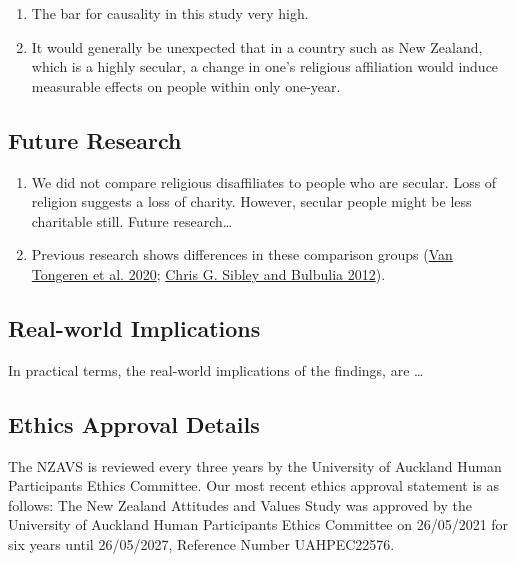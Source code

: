 \documentclass[
  singlecolumn]{report}
\providecommand{\tightlist}{%
  \setlength{\itemsep}{0pt}\setlength{\parskip}{0pt}}\usepackage{longtable,booktabs,array}
\begin{document}
\begin{enumerate}
\def\labelenumi{\arabic{enumi}.}
\tightlist
\item
  The bar for causality in this study very high.
\item
  It would generally be unexpected that in a country such as New
  Zealand, which is a highly secular, a change in one's religious
  affiliation would induce measurable effects on people within only
  one-year.
\end{enumerate}

\hypertarget{future-research}{%
\subsection{Future Research}\label{future-research}}

\begin{enumerate}
\def\labelenumi{\arabic{enumi}.}
\tightlist
\item
  We did not compare religious disaffiliates to people who are secular.
  Loss of religion suggests a loss of charity. However, secular people
  might be less charitable still. Future research\ldots{}
\item
  Previous research shows differences in these comparison groups
  (\protect\hyperlink{ref-vantongeren2020}{Van Tongeren et al. 2020};
  \protect\hyperlink{ref-sibley2012a}{Chris G. Sibley and Bulbulia
  2012}).
\end{enumerate}

\hypertarget{real-world-implications}{%
\subsection{Real-world Implications}\label{real-world-implications}}

In practical terms, the real-world implications of the findings, are
\ldots{}

\hypertarget{ethics-approval-details}{%
\subsection{Ethics Approval Details}\label{ethics-approval-details}}

The NZAVS is reviewed every three years by the University of Auckland
Human Participants Ethics Committee. Our most recent ethics approval
statement is as follows: The New Zealand Attitudes and Values Study was
approved by the University of Auckland Human Participants Ethics
Committee on 26/05/2021 for six years until 26/05/2027, Reference Number
UAHPEC22576.
\end{document}
